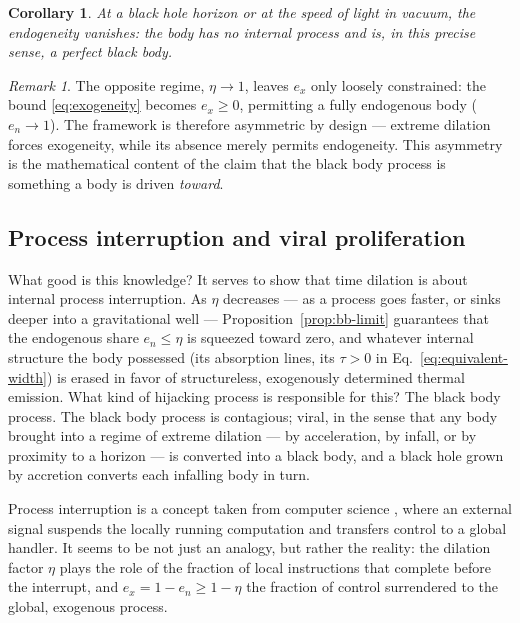 \documentclass[10pt]{article}
\newtheorem{corollary}{Corollary}
\theoremstyle{definition}
\theoremstyle{remark}
\newtheorem{remark}{Remark}
\begin{document}
\begin{corollary}
At a black hole horizon or at the speed of light in vacuum, the endogeneity vanishes: the body has no internal process and is, in this precise sense, a perfect black body.
\end{corollary}

\begin{remark}
The opposite regime, $\eta \to 1$, leaves $e_x$ only loosely constrained: the bound \eqref{eq:exogeneity} becomes $e_x \ge 0$, permitting a fully endogenous body ($e_n \to 1$). The framework is therefore asymmetric by design --- extreme dilation forces exogeneity, while its absence merely permits endogeneity. This asymmetry is the mathematical content of the claim that the black body process is something a body is driven \emph{toward}.
\end{remark}

\subsection{Process interruption and viral proliferation}

What good is this knowledge? It serves to show that time dilation is about internal process interruption. As $\eta$ decreases --- as a process goes faster, or sinks deeper into a gravitational well --- Proposition~\ref{prop:bb-limit} guarantees that the endogenous share $e_n \le \eta$ is squeezed toward zero, and whatever internal structure the body possessed (its absorption lines, its $\tau > 0$ in Eq.~\eqref{eq:equivalent-width}) is erased in favor of structureless, exogenously determined thermal emission. What kind of hijacking process is responsible for this? The black body process. The black body process is contagious; viral, in the sense that any body brought into a regime of extreme dilation --- by acceleration, by infall, or by proximity to a horizon --- is converted into a black body, and a black hole grown by accretion converts each infalling body in turn.

Process interruption is a concept taken from computer science \cite{intel}, where an external signal suspends the locally running computation and transfers control to a global handler. It seems to be not just an analogy, but rather the reality: the dilation factor $\eta$ plays the role of the fraction of local instructions that complete before the interrupt, and $e_x = 1 - e_n \ge 1 - \eta$ the fraction of control surrendered to the global, exogenous process.
\end{document}
